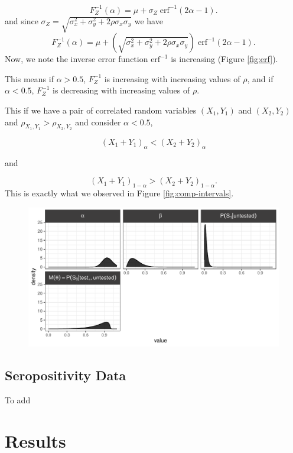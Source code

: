\documentclass[12pt,twoside]{smiththesis}
\begin{document}
\[F_Z^{-1}(\alpha)=\mu +\sigma_Z \; \text{erf}^{-1}(2\alpha - 1).\]
and since \(\sigma_Z=\sqrt{\sigma_x^2 +\sigma_y^2 + 2 \rho \sigma_x \sigma_y }\) we have
\[F_Z^{-1}(\alpha)=\mu + \left(\sqrt{\sigma_x^2 +\sigma_y^2 + 2 \rho \sigma_x \sigma_y } \right) \; \text{erf}^{-1}(2\alpha - 1).\]
Now, we note the inverse error function \(\text{erf}^{-1}\) is increasing (Figure \ref{fig:erf}).

This means if \(\alpha > 0.5\), \(F_Z^{-1}\) is increasing with increasing values of \(\rho\), and if \(\alpha < 0.5\), \(F_Z^{-1}\) is decreasing with increasing values of \(\rho\).

This if we have a pair of correlated random variables \((X_1,Y_1)\) and \((X_2,Y_2)\) and \(\rho_{X_1,Y_1} > \rho_{X_2,Y_2}\) and consider \(\alpha < 0.5\),

\[(X_1+Y_1)_\alpha <(X_2+Y_2)_\alpha\]

and

\[(X_1+Y_1)_{1-\alpha} > (X_2+Y_2)_{1-\alpha}.\]
This is exactly what we observed in Figure \ref{fig:comp-intervals}.
\begin{figure}

{\centering \includegraphics{thesis_files/figure-latex/unnamed-chunk-68-1} 

}

\caption{\label{fig:erf}}\label{fig:unnamed-chunk-68}
\end{figure}
\hypertarget{seropositivity-data}{%
\section{Seropositivity Data}\label{seropositivity-data}}

To add

\hypertarget{results-1}{%
\chapter{Results}\label{results-1}}
\end{document}
